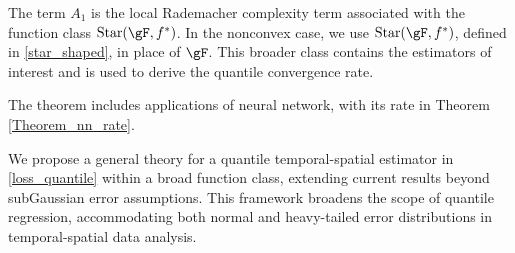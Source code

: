 \documentclass[twoside,11pt]{article}
\newcommand{\rev}[1]{{\color{revisionred}#1}}
\begin{document}
\rev{The term $A_1$ is the local Rademacher complexity term associated with the function class $\text{Star}(\gF, f^\ast)$.}
\rev{In the nonconvex case, we use $\text{Star}(\gF, f^\ast)$, defined in \eqref{star_shaped}, in place of $\gF$. This broader class contains the estimators of interest and is used to derive the quantile convergence rate.}

The theorem includes applications of neural network, with its rate in Theorem \ref{Theorem_nn_rate}.


We propose a general theory for a quantile temporal-spatial estimator in \eqref{loss_quantile} within a broad function class, extending current results beyond subGaussian error assumptions. This framework broadens the scope of quantile regression, accommodating both normal and heavy-tailed error distributions in temporal-spatial data analysis.
\end{document}
